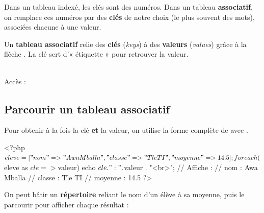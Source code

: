 Dans un tableau indexé, les clés sont des numéros. Dans un tableau
\textbf{associatif}, on remplace ces numéros par des \textbf{clés} de notre choix
(le plus souvent des mots), associées chacune à une valeur.

\begin{definition}
Un \textbf{tableau associatif} relie des \textbf{clés} (\emph{keys}) à des
\textbf{valeurs} (\emph{values}) grâce à la flèche \code{=>}. La clé sert
d'« étiquette » pour retrouver la valeur.
\end{definition}


\begin{syntaxe}
\\
Accès : 
\end{syntaxe}

\subsection{Parcourir un tableau associatif}

Pour obtenir à la fois la clé \textbf{et} la valeur, on utilise la forme complète
de  avec \code{=>}.

\begin{syntaxe}
\end{syntaxe}

\begin{codephp}
<?php
  $eleve = [
    "nom"     => "Awa Mballa",
    "classe"  => "Tle TI",
    "moyenne" => 14.5
  ];

  foreach ($eleve as $cle => $valeur) {
    echo $cle . " : " . $valeur . "<br>";
  }
  // Affiche :
  // nom : Awa Mballa
  // classe : Tle TI
  // moyenne : 14.5
?>
\end{codephp}

\begin{exemple}
On peut bâtir un \textbf{répertoire} reliant le nom d'un élève à sa moyenne, puis
le parcourir pour afficher chaque résultat :
\end{exemple}


